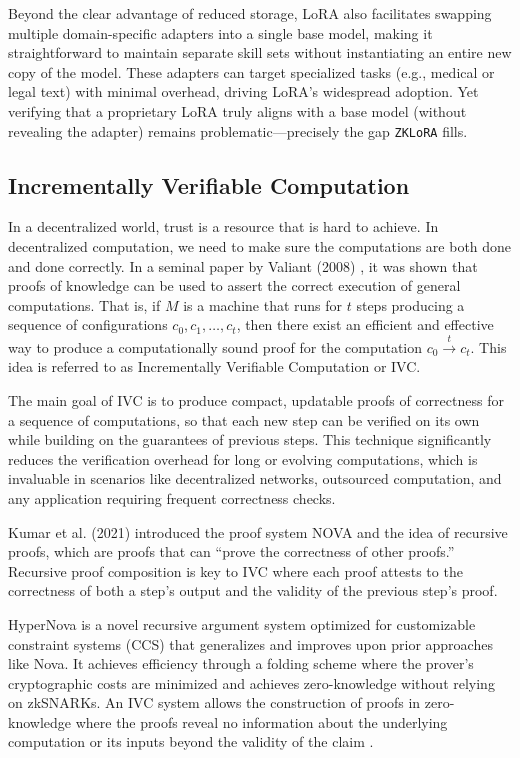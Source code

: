 \documentclass[11pt]{article}
\begin{document}
Beyond the clear advantage of reduced storage, LoRA also facilitates swapping multiple domain-specific adapters into a single base model, making it straightforward to maintain separate skill sets without instantiating an entire new copy of the model. These adapters can target specialized tasks (e.g., medical or legal text) with minimal overhead, driving LoRA’s widespread adoption. Yet verifying that a proprietary LoRA truly aligns with a base model (without revealing the adapter) remains problematic—precisely the gap \texttt{ZKLoRA} fills.

\subsection{Incrementally Verifiable Computation}
In a decentralized world, trust is a resource that is hard to achieve. In decentralized computation, we need to make sure the computations are both done and done correctly. In a seminal paper by Valiant (2008) \cite{valiant2008incrementally}, it was shown that proofs of knowledge can be used to assert the correct execution of general computations. That is, if $M$ is a machine that runs for $t$ steps producing a sequence of configurations $c_0,c_1,\dots,c_t$, then there exist an efficient and effective way to produce a computationally sound proof for the computation $c_0  \xrightarrow{t} c_t$. This idea is referred to as Incrementally Verifiable Computation or IVC.

The main goal of IVC is to produce compact, updatable proofs of correctness for a sequence of computations, so that each new step can be verified on its own while building on the guarantees of previous steps. This technique significantly reduces the verification overhead for long or evolving computations, which is invaluable in scenarios like decentralized networks, outsourced computation, and any application requiring frequent correctness checks.

Kumar et al. (2021) \cite{kothapalli2022nova} introduced the proof system NOVA and the idea of recursive proofs, which are proofs that can ``prove the correctness of other proofs.'' Recursive proof composition is key to IVC where each proof attests to the correctness of both a step’s output and the validity of the previous step’s proof.

HyperNova \cite{kothapalli2024hypernova} is a novel recursive argument system optimized for customizable constraint systems (CCS) that generalizes and improves upon prior approaches like Nova. It achieves efficiency through a folding scheme where the prover’s cryptographic costs are minimized and achieves zero-knowledge without relying on zkSNARKs. An IVC system allows the construction of proofs in zero-knowledge where the proofs reveal no information about the underlying computation or its inputs beyond the validity of the claim \cite{valiant2008incrementally}.
\end{document}
